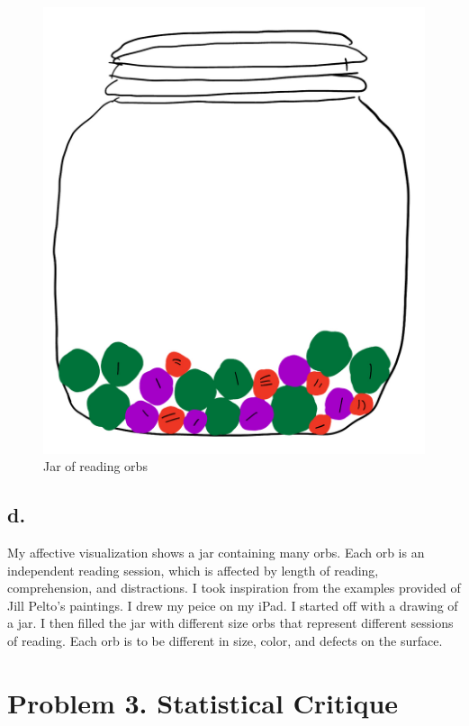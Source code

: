 \documentclass[
  letterpaper,
  DIV=11,
  numbers=noendperiod]{scrartcl}
\begin{document}
\begin{figure}[H]

{\centering \includegraphics{../IMG_0317.png}

}

\caption{Jar of reading orbs}

\end{figure}%

\subsection{d.}\label{d.-1}

My affective visualization shows a jar containing many orbs. Each orb is
an independent reading session, which is affected by length of reading,
comprehension, and distractions. I took inspiration from the examples
provided of Jill Pelto's paintings. I drew my peice on my iPad. I
started off with a drawing of a jar. I then filled the jar with
different size orbs that represent different sessions of reading. Each
orb is to be different in size, color, and defects on the surface.

\section{Problem 3. Statistical
Critique}\label{problem-3.-statistical-critique}
\end{document}
